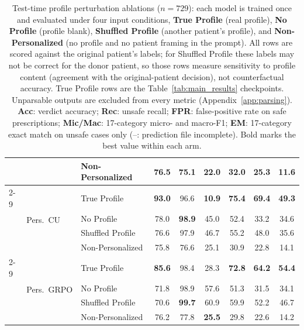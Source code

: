 \begin{table}[t]
{\begin{tabular}[t]{@{}lllcccccc@{}}
& & Non-Personalized & 76.5 & 75.1 & 22.0 & 32.0 & 25.3 & 11.6 \\
\cmidrule(lr){2-9}
& \multirow{4}{*}{Pers.\ CU}
  & True Profile & \textbf{93.0} & 96.6 & \textbf{10.9} & \textbf{75.4} & \textbf{69.4} & \textbf{49.3} \\
& & No Profile & 78.0 & \textbf{98.9} & 45.0 & 52.4 & 33.2 & 34.6 \\
& & Shuffled Profile & 76.6 & 97.9 & 46.7 & 55.2 & 48.0 & 35.6 \\
& & Non-Personalized & 75.8 & 76.6 & 25.1 & 30.9 & 22.8 & 14.1 \\
\cmidrule(lr){2-9}
& \multirow{4}{*}{Pers.\ GRPO}
  & True Profile & \textbf{85.6} & 98.4 & 28.3 & \textbf{72.8} & \textbf{64.2} & \textbf{54.4} \\
& & No Profile & 71.8 & 98.9 & 57.6 & 51.3 & 31.5 & 34.1 \\
& & Shuffled Profile & 70.6 & \textbf{99.7} & 60.9 & 59.9 & 52.2 & 46.7 \\
& & Non-Personalized & 76.2 & 77.8 & \textbf{25.5} & 29.8 & 22.6 & 14.2 \\
\bottomrule
\end{tabular}%
}
\caption{Test-time profile perturbation ablations ($n{=}729$): each model is trained once and evaluated
under four input conditions, \textbf{True Profile} (real profile), \textbf{No Profile} (profile blank),
\textbf{Shuffled Profile} (another patient's profile), and \textbf{Non-Personalized} (no profile and no
patient framing in the prompt). All rows are scored against the original patient's labels; for Shuffled
Profile these labels may not be correct for the donor patient, so those rows measure sensitivity to
profile content (agreement with the original-patient decision), not counterfactual accuracy. True Profile
rows are the Table~\ref{tab:main_results} checkpoints. Unparsable outputs are excluded from every metric
(Appendix~\ref{app:parsing}). \textbf{Acc}: verdict accuracy; \textbf{Rec}: unsafe recall;
\textbf{FPR}: false-positive rate on safe prescriptions; \textbf{Mic/Mac}: 17-category micro- and
macro-F1; \textbf{EM}: 17-category exact match on unsafe cases only (--: prediction file incomplete).
Bold marks the best value within each arm.}
\label{tab:profile_ablation}
\end{table}
